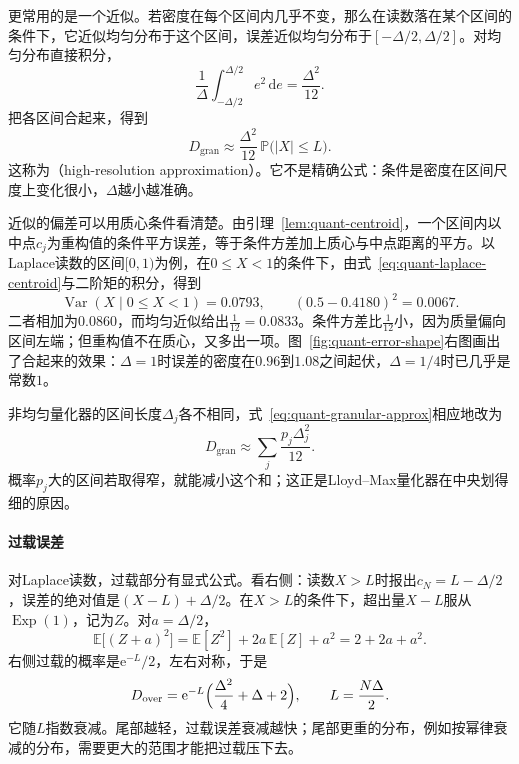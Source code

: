更常用的是一个近似。若密度在每个区间内几乎不变，那么在读数落在某个区间的条件下，它近似均匀分布于这个区间，误差近似均匀分布于$[-\Delta/2,\Delta/2]$。对均匀分布直接积分，
\[
 \frac{1}{\Delta}\int_{-\Delta/2}^{\Delta/2}e^{2}\,\mathrm{d}e=\frac{\Delta^{2}}{12} .
\]
把各区间合起来，得到
\begin{equation}
 D_{\mathrm{gran}}\approx\frac{\Delta^{2}}{12}\,\mathbb{P}\bigl(\lvert X\rvert\leq L\bigr) .
 \label{eq:quant-granular-approx}
\end{equation}
这称为（high-resolution approximation）。它不是精确公式：条件是密度在区间尺度上变化很小，$\Delta$越小越准确。

近似的偏差可以用质心条件看清楚。由引理~\ref{lem:quant-centroid}，一个区间内以中点$c_j$为重构值的条件平方误差，等于条件方差加上质心与中点距离的平方。以Laplace读数的区间$[0,1)$为例，在$0\leq X<1$的条件下，由式~\eqref{eq:quant-laplace-centroid}与二阶矩的积分，得到
\[
 \operatorname{Var}(X\mid0\leq X<1)=0.0793,\qquad (0.5-0.4180)^{2}=0.0067 .
\]
二者相加为$0.0860$，而均匀近似给出$\tfrac1{12}=0.0833$。条件方差比$\tfrac1{12}$小，因为质量偏向区间左端；但重构值不在质心，又多出一项。图~\ref{fig:quant-error-shape}右图画出了合起来的效果：$\Delta=1$时误差的密度在$0.96$到$1.08$之间起伏，$\Delta=1/4$时已几乎是常数$1$。

非均匀量化器的区间长度$\Delta_j$各不相同，式~\eqref{eq:quant-granular-approx}相应地改为
\[
 D_{\mathrm{gran}}\approx\sum_{j}\frac{p_j\Delta_j^{2}}{12} .
\]
概率$p_j$大的区间若取得窄，就能减小这个和；这正是Lloyd--Max量化器在中央划得细的原因。

\paragraph{过载误差}
对Laplace读数，过载部分有显式公式。看右侧：读数$X>L$时报出$c_N=L-\Delta/2$，误差的绝对值是$(X-L)+\Delta/2$。在$X>L$的条件下，超出量$X-L$服从$\operatorname{Exp}(1)$，记为$Z$。对$a=\Delta/2$，
\[
 \mathbb{E}\bigl[(Z+a)^{2}\bigr]=\mathbb{E}[Z^{2}]+2a\,\mathbb{E}[Z]+a^{2}=2+2a+a^{2} .
\]
右侧过载的概率是$\mathrm{e}^{-L}/2$，左右对称，于是
\begin{equation}
 D_{\mathrm{over}}=\mathrm{e}^{-L}\Bigl(\frac{\Delta^{2}}{4}+\Delta+2\Bigr),\qquad L=\frac{N\Delta}{2} .
 \label{eq:quant-laplace-overload}
\end{equation}
它随$L$指数衰减。尾部越轻，过载误差衰减越快；尾部更重的分布，例如按幂律衰减的分布，需要更大的范围才能把过载压下去。

